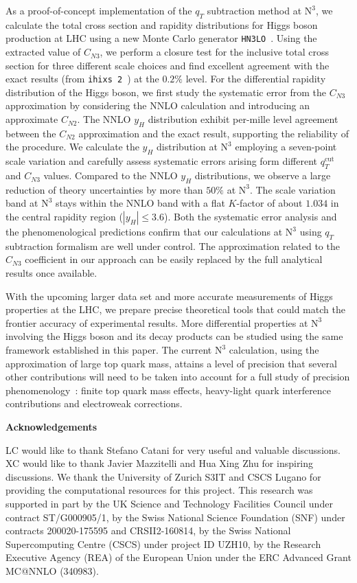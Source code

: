 \documentclass[12pt]{article}
\DeclareRobustCommand{\qt}{\ensuremath{q_T}\xspace}
\DeclareRobustCommand{\qtcut}{\ensuremath{q_T^\mathrm{cut}}\xspace}
\DeclareRobustCommand{\LO}{\text{LO}\xspace}
\DeclareRobustCommand{\N}[1]{\ensuremath{\text{N}^{#1}}} %
\begin{document}
As a proof-of-concept implementation of the $\qt$ subtraction method at \N3\LO,  we calculate the total cross section and rapidity distributions for Higgs boson production at LHC using a new Monte Carlo generator \texttt{HN3LO}~\cite{leaninprepHN3LO}. Using the extracted value of $C_{N3}$, we perform a closure test for the inclusive total cross section for three different scale choices and find excellent agreement with the exact results (from \texttt{ihixs 2}~\cite{Dulat:2018rbf}) at the $0.2\%$ level. For the differential rapidity distribution of the Higgs boson, we first study the systematic error from the $C_{N3}$ approximation by considering the NNLO calculation and introducing an approximate $C_{N2}$. The NNLO $y_H$ distribution exhibit per-mille level agreement between the $C_{N2}$ approximation and the exact result, supporting the reliability of the procedure. 
We calculate the $y_H$ distribution at \N3\LO employing a seven-point scale variation and carefully assess systematic errors arising form different $\qtcut$ and $C_{N3}$ values. Compared to the NNLO $y_H$ distributions, we observe a large reduction of theory uncertainties by more than $50\%$ at \N3\LO. The scale variation band at \N3\LO stays within the NNLO band with a flat $K$-factor of about $1.034$ in the central rapidity region ($|y_H|\leq3.6$). Both the systematic error analysis and the phenomenological predictions confirm that our calculations at \N3\LO using $\qt$ subtraction formalism are well under control. The approximation related to the $C_{N3}$ coefficient in our approach can be easily replaced by the full analytical results once available. 

With the upcoming larger data set and more accurate measurements of Higgs properties at the LHC, we prepare precise theoretical tools that could match the frontier accuracy of experimental results. More differential properties at \N3\LO involving the Higgs boson and its decay products can be studied using the same framework established in this paper. The current \N3\LO calculation, using the approximation of large top quark mass, attains a level of  precision that several 
other contributions will need to be taken into account for a full study of precision phenomenology~\cite{Anastasiou:2016cez}: finite top quark mass effects, heavy-light quark interference contributions  
and electroweak corrections. 


\bigskip\noindent\textbf{Acknowledgements}

LC would like to thank Stefano Catani for very useful and valuable discussions. XC would like to thank Javier Mazzitelli and Hua Xing Zhu for inspiring discussions. We thank the University of Zurich S3IT and CSCS Lugano for providing the computational resources for this project. This research was supported in part by the UK Science and Technology Facilities Council under contract ST/G000905/1, by the Swiss National Science Foundation (SNF) under contracts 200020-175595 and CRSII2-160814, by the Swiss National Supercomputing Centre (CSCS) under project ID UZH10, by the Research Executive Agency (REA) of the European Union under the ERC Advanced Grant MC@NNLO (340983).
\end{document}
